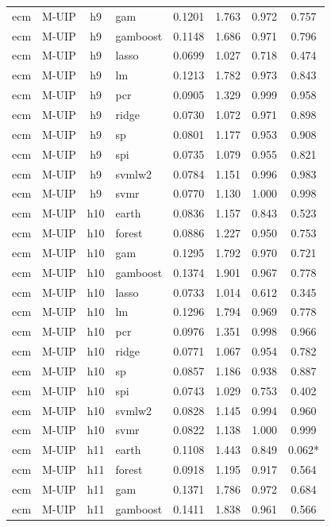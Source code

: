 \begin{ThreePartTable}
\begin{longtable}[t]{llclcccc}
ecm & M-UIP & h9 & gam & 0.1201 & 1.763 & 0.972 & 0.757\\
ecm & M-UIP & h9 & gamboost & 0.1148 & 1.686 & 0.971 & 0.796\\
ecm & M-UIP & h9 & lasso & 0.0699 & 1.027 & 0.718 & 0.474\\
ecm & M-UIP & h9 & lm & 0.1213 & 1.782 & 0.973 & 0.843\\
ecm & M-UIP & h9 & pcr & 0.0905 & 1.329 & 0.999 & 0.958\\
ecm & M-UIP & h9 & ridge & 0.0730 & 1.072 & 0.971 & 0.898\\
ecm & M-UIP & h9 & sp & 0.0801 & 1.177 & 0.953 & 0.908\\
ecm & M-UIP & h9 & spi & 0.0735 & 1.079 & 0.955 & 0.821\\
ecm & M-UIP & h9 & svmlw2 & 0.0784 & 1.151 & 0.996 & 0.983\\
ecm & M-UIP & h9 & svmr & 0.0770 & 1.130 & 1.000 & 0.998\\
\addlinespace
ecm & M-UIP & h10 & earth & 0.0836 & 1.157 & 0.843 & 0.523\\
ecm & M-UIP & h10 & forest & 0.0886 & 1.227 & 0.950 & 0.753\\
ecm & M-UIP & h10 & gam & 0.1295 & 1.792 & 0.970 & 0.721\\
ecm & M-UIP & h10 & gamboost & 0.1374 & 1.901 & 0.967 & 0.778\\
ecm & M-UIP & h10 & lasso & 0.0733 & 1.014 & 0.612 & 0.345\\
ecm & M-UIP & h10 & lm & 0.1296 & 1.794 & 0.969 & 0.778\\
ecm & M-UIP & h10 & pcr & 0.0976 & 1.351 & 0.998 & 0.966\\
ecm & M-UIP & h10 & ridge & 0.0771 & 1.067 & 0.954 & 0.782\\
ecm & M-UIP & h10 & sp & 0.0857 & 1.186 & 0.938 & 0.887\\
ecm & M-UIP & h10 & spi & 0.0743 & 1.029 & 0.753 & 0.402\\
ecm & M-UIP & h10 & svmlw2 & 0.0828 & 1.145 & 0.994 & 0.960\\
ecm & M-UIP & h10 & svmr & 0.0822 & 1.138 & 1.000 & 0.999\\
\addlinespace
ecm & M-UIP & h11 & earth & 0.1108 & 1.443 & 0.849 & 0.062*\\
ecm & M-UIP & h11 & forest & 0.0918 & 1.195 & 0.917 & 0.564\\
ecm & M-UIP & h11 & gam & 0.1371 & 1.786 & 0.972 & 0.684\\
ecm & M-UIP & h11 & gamboost & 0.1411 & 1.838 & 0.961 & 0.566\\

\end{longtable}
\end{ThreePartTable}
